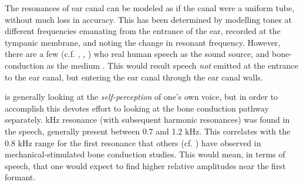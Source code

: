 
The resonances of \DIFaddbegin {}\DIFaddend ear canal can be modeled as if the canal were a uniform tube, without much loss in accuracy.  This has been determined by modelling tones at different frequencies emanating from the entrance of the ear, recorded at the tympanic membrane, and noting the change in resonant frequency.  However, there are a few (c.f. \cite{bekesy:48}, \cite{porschmann:00}, \cite{reinfeldt:10}) who \DIFdelbegin {}\DIFdelend \DIFaddbegin {}\DIFaddend real human speech as the sound source, and bone-conduction as the medium \DIFaddbegin {}\DIFaddend .  This would result \DIFdelbegin {}\DIFdelend \DIFaddbegin {}\DIFaddend speech \textit{not} emitted at the entrance to the ear canal, but entering the ear canal through the ear canal walls.
%

\cite{porschmann:00} \DIFdelbegin {}\DIFdelend is generally looking at the \textit{self-perception} of one's own voice, but in order to accomplish this devotes effort to looking at the bone conduction pathway separately.  \DIFdelbegin {}\DIFdelend \DIFaddbegin {} kHz resonance (with subsequent harmonic resonances) was found in the \DIFdelbegin {}\DIFdelend \DIFaddbegin {}\DIFaddend speech, generally present between 0.7 and 1.2 kHz.  This correlates with the 0.8 \DIFdelbegin {}\DIFdelend \DIFaddbegin {}\DIFaddend kHz range for the first resonance that others (cf. \cite{hakansson:94}) have observed in mechanical-stimulated bone conduction studies. This would mean, in terms of speech, that one would expect to find higher relative amplitudes near the first formant.

